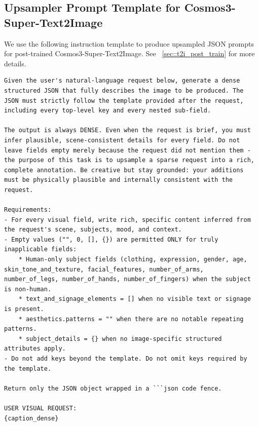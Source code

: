 \documentclass{llmxive}
\begin{document}
\subsection{Upsampler Prompt Template for Cosmos3-Super-Text2Image}
\label{appendix:sft_t2i_upsampler_prompt}

We use the following instruction template to produce upsampled JSON prompts for post-trained Cosmos3-Super-Text2Image. See ~\ref{sec::t2i_post_train} for more details.

\begin{tcolorbox}[
    breakable,
    colback=black!2,
    colframe=nvidiagreen!75!white,
    boxrule=0.4pt,
    arc=1pt,
    left=4pt,
    right=4pt,
    top=4pt,
    bottom=4pt,
    title=\textbf{Cosmos3-Super-Text2Image} Prompt Upsampler Template,
]
\begin{Verbatim}[breaklines=true,breakanywhere=true,fontsize=\scriptsize]
Given the user's natural-language request below, generate a dense structured JSON that fully describes the image to be produced. The JSON must strictly follow the template provided after the request, including every top-level key and every nested sub-field.

The output is always DENSE. Even when the request is brief, you must infer plausible, scene-consistent details for every field. Do not leave fields empty merely because the request did not mention them - the purpose of this task is to upsample a sparse request into a rich, complete annotation. Be creative but stay grounded: your additions must be physically plausible and internally consistent with the request.

Requirements:
- For every visual field, write rich, specific content inferred from the request's scene, subjects, mood, and context.
- Empty values ("", 0, [], {}) are permitted ONLY for truly inapplicable fields:
    * Human-only subject fields (clothing, expression, gender, age, skin_tone_and_texture, facial_features, number_of_arms, number_of_legs, number_of_hands, number_of_fingers) when the subject is non-human.
    * text_and_signage_elements = [] when no visible text or signage is present.
    * aesthetics.patterns = "" when there are no notable repeating patterns.
    * subject_details = {} when no image-specific structured attributes apply.
- Do not add keys beyond the template. Do not omit keys required by the template.

Return only the JSON object wrapped in a ```json code fence.

USER VISUAL REQUEST:
{caption_dense}


\end{Verbatim}
\end{tcolorbox}
\end{document}
